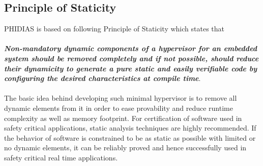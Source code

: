 \subsection{Principle of Staticity}
PHIDIAS is based on following Principle of Staticity which states that \\
\\
\textbf{\textit{Non-mandatory dynamic components of a hypervisor for an embedded system should be removed completely and if not possible, should reduce their dynamicity to generate a pure static and easily verifiable code by configuring the desired characteristics at compile time}}.\\
\\
The basic idea behind developing such minimal hypervisor is to remove all dynamic elements from it in order to ease provability and reduce runtime complexity as well as memory footprint. For certification of software used in safety critical applications, static analysis techniques are highly recommended. If the behavior of software is constrained to be as static as possible with limited or no dynamic elements, it can be reliably proved and hence successfully used in safety critical real time applications.

